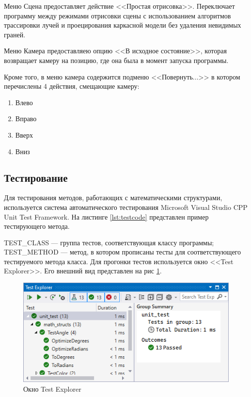 Меню Сцена предоставляет действие <<Простая отрисовка>>. Переключает программу между режимами отрисовки сцены с использованием алгоритмов трассировки лучей и проецирования каркасной модели без удаления невидимых граней.

Меню Камера предоставляею опцию <<В исходное состояние>>, которая возвращает камеру на позицию, где она была в момент запуска программы.

Кроме того, в меню камера содержится подменю <<Повернуть...>> в котором перечислены 4 действия, смещающие камеру:
\begin{enumerate}
	\item Влево
	\item Вправо
	\item Вверх
	\item Вниз
\end{enumerate}

\subsection{Тестирование}
Для тестирования методов, работающих с математическими структурами, используется система автоматического тестирования Microsoft Visual Studio CPP Unit Test Framework. На листинге \ref{lst:testcode} представлен пример тестирующего метода.

TEST\_CLASS --- группа тестов, соответствующая классу программы; TEST\_METHOD --- метод, в котором прописаны тесты для соответствующего тестируемого метода класса. Для прогонки тестов используется окно <<Test Explorer>>. Его внешний вид представлен на рис \ref{fig:test_explorer}.

\begin{figure}[ht]
	\centering
	\includegraphics[width=1\linewidth]{img/test_explorer}
	\caption{Окно Test Explorer}
	\label{fig:test_explorer}
\end{figure}
\clearpage

